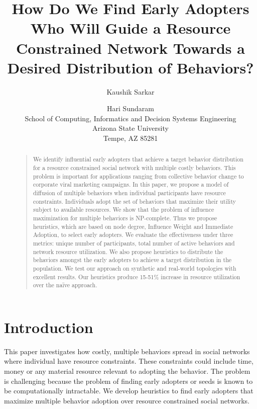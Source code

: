 \documentclass[letterpaper]{article}
\theoremstyle{plain} 		\newtheorem{thm}{Theorem}[section]
\theoremstyle{definition} 	\newtheorem{defn}[thm]{Definition}
\theoremstyle{remark}		\newtheorem{rem}{Remark}
\begin{document}
\title{How Do We Find Early Adopters Who Will Guide a Resource Constrained Network Towards a Desired Distribution of Behaviors?}

\author{Kaushik Sarkar \and Hari Sundaram\\
School of Computing, Informatics and Decision Systems Engineering\\
Arizona State University\\
Tempe, AZ 85281\\
}

\maketitle

\begin{abstract}
\begin{quote}
We identify influential early adopters that achieve a target behavior distribution for a resource constrained social network with multiple costly behaviors. This problem is important for applications ranging from collective behavior change to corporate viral marketing campaigns. In this paper, we propose a model of diffusion of multiple behaviors when individual participants have resource constraints. Individuals adopt the set of behaviors that maximize their utility subject to available resources. We show that the problem of influence maximization for multiple behaviors is NP-complete. Thus we propose heuristics, which are based on node degree, Influence Weight  and Immediate Adoption, to select early adopters. We evaluate the effectiveness under three metrics: unique number of participants, total number of active behaviors and network resource utilization. We also propose heuristics to distribute the behaviors amongst the early adopters to achieve a target distribution in the population. We test our approach on synthetic and real-world topologies with excellent results. Our heuristics produce 15-51\% increase in resource utilization over the na\"ive approach.
\end{quote}
\end{abstract}

\section{Introduction}
This paper investigates how costly, multiple behaviors spread in social networks where individual have resource constraints. These constraints could include time, money or any material resource relevant to adopting the behavior.  The problem is challenging because the problem of finding early adopters or seeds is known to be computationally intractable. We develop heuristics to find early adopters that maximize multiple behavior adoption over resource constrained social networks.
\end{document}
